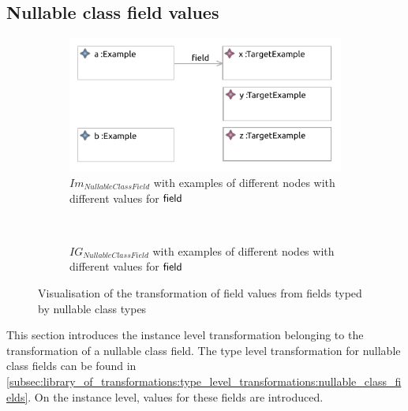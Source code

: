 \subsection{Nullable class field values}
\label{subsec:library_of_transformations:instance_level_transformations:nullable_class_field_values}

\begin{figure}
    \centering
    \begin{subfigure}{0.95\textwidth}
        \centering
        \includegraphics{images/05_library_of_transformations/03_instance_level_transformations/08_nullable_class_field_values/nullable_class_field_value.pdf}
        \caption{$Im_{NullableClassField}$ with examples of different nodes with different values for $\mathsf{field}$}
        \label{fig:library_of_transformations:instance_level_transformations:nullable_class_field_values:visualisation:ecore}
    \end{subfigure}
    \\
    \begin{subfigure}{0.95\textwidth}
        \centering
        
        \caption{$IG_{NullableClassField}$ with examples of different nodes with different values for $\mathsf{field}$}
        \label{fig:library_of_transformations:instance_level_transformations:nullable_class_field_values:visualisation:groove}
    \end{subfigure}
    \caption{Visualisation of the transformation of field values from fields typed by nullable class types}
    \label{fig:library_of_transformations:instance_level_transformations:nullable_class_field_values:visualisation}
\end{figure}

This section introduces the instance level transformation belonging to the transformation of a nullable class field. The type level transformation for nullable class fields can be found in \cref{subsec:library_of_transformations:type_level_transformations:nullable_class_fields}. On the instance level, values for these fields are introduced.

